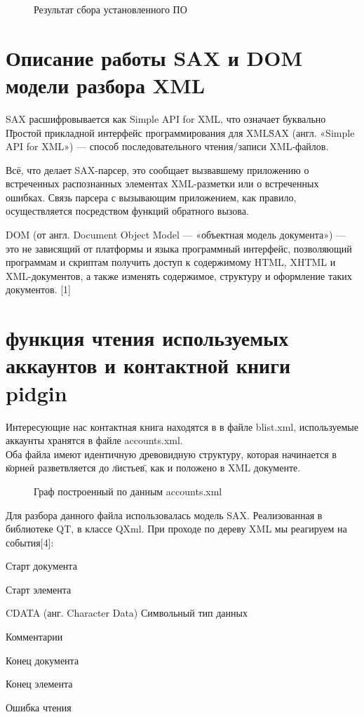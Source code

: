 \begin{figure}[h]
\caption{Результат сбора установленного ПО}
\label{pic:xml_to_xslt7}
\end{figure}

\chapter*{Описание работы SAX и DOM модели разбора XML}

SAX расшифровывается как Simple API for XML, что означает буквально \"Простой прикладной интерфейс программирования для XML\"

SAX (англ. «Simple API for XML») — способ последовательного чтения/записи XML-файлов.

Всё, что делает SAX-парсер, это сообщает вызвавшему приложению о встреченных распознанных элементах XML-разметки или о встреченных ошибках. Связь парсера с вызывающим приложением, как правило, осуществляется посредством функций обратного вызова.

DOM (от англ. Document Object Model — «объектная модель документа») — это не зависящий от платформы и языка программный интерфейс, позволяющий программам и скриптам получить доступ к содержимому HTML, XHTML и XML-документов, а также изменять содержимое, структуру и оформление таких документов.
[1]%
\chapter*{функция чтения используемых аккаунтов и контактной книги pidgin}
Интересующие нас контактная книга находятся в %
в файле blist.xml, используемые аккаунты хранятся в файле accounts.xml.
\\Оба файла имеют идентичную древовидную структуру, которая начинается в \"корне\" и разветвляется до \"листьев\", как и положено в XML документе.
\begin{figure}[h]
\caption{Граф построенный по данным accounts.xml}
\label{pic:xml_to_xslt7}
\end{figure}

Для разбора данного файла использовалась модель SAX. Реализованная в библиотеке QT, в классе QXml. При проходе по дереву XML мы реагируем на события[4]:
\item Старт документа
\item Старт элемента
\item CDATA (анг. Character Data) Символьный тип данных
\item Комментарии
\item Конец документа
\item Конец элемента
\item Ошибка чтения

